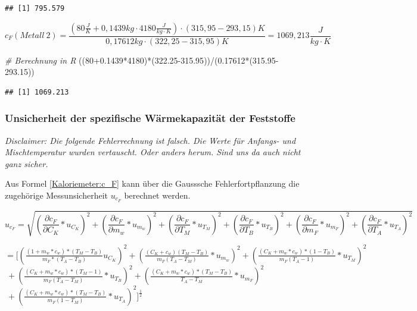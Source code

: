 \documentclass[
  9pt,
]{article}
\newenvironment{Shaded}{\begin{snugshade}}{\end{snugshade}}
\newcommand{\CommentTok}[1]{\textcolor[rgb]{0.56,0.35,0.01}{\textit{#1}}}
\newcommand{\DecValTok}[1]{\textcolor[rgb]{0.00,0.00,0.81}{#1}}
\newcommand{\FloatTok}[1]{\textcolor[rgb]{0.00,0.00,0.81}{#1}}
\newcommand{\NormalTok}[1]{#1}
\newcommand{\SpecialCharTok}[1]{\textcolor[rgb]{0.00,0.00,0.00}{#1}}
\begin{document}
\begin{verbatim}
## [1] 795.579
\end{verbatim}

\[c_F(Metall\ 2) = \frac{(80\frac{J}{K}+0,1439kg\cdot 4180\frac{J}{kg\cdot K})\cdot (315,95-293,15)K}{0,17612kg\cdot(322,25-315,95)K}= 1069,213\frac{J}{kg\cdot K}\]

\begin{Shaded}
\begin{Highlighting}[]
\CommentTok{\# Berechnung in R}
\NormalTok{((}\DecValTok{80}\FloatTok{+0.1439}\SpecialCharTok{*}\DecValTok{4180}\NormalTok{)}\SpecialCharTok{*}\NormalTok{(}\FloatTok{322.25{-}315.95}\NormalTok{))}\SpecialCharTok{/}\NormalTok{(}\FloatTok{0.17612}\SpecialCharTok{*}\NormalTok{(}\FloatTok{315.95{-}293.15}\NormalTok{))}
\end{Highlighting}
\end{Shaded}

\begin{verbatim}
## [1] 1069.213
\end{verbatim}

\hypertarget{unsicherheit-der-spezifische-wuxe4rmekapazituxe4t-der-feststoffe}{%
\subsubsection{Unsicherheit der spezifische Wärmekapazität der
Feststoffe}\label{unsicherheit-der-spezifische-wuxe4rmekapazituxe4t-der-feststoffe}}

\emph{Disclaimer: Die folgende Fehlerrechnung ist falsch. Die Werte für
Anfangs- und Mischtemperatur wurden vertauscht. Oder anders herum. Sind
uns da auch nicht ganz sicher.}

Aus Formel \ref{Kaloriemeter:c_F} kann über die Gausssche
Fehlerfortpflanzung die zugehörige Messunsicherheit \(u_{c_F}\)
berechnet werden.

\[u_{c_F}=\sqrt{(\frac{\partial c_F}{\partial C_K}*u_{C_K})^2+(\frac{\partial c_F}{\partial m_w}*u_{m_w})^2+(\frac{\partial c_F}{\partial T_M}*u_{T_M})^2+ (\frac{\partial c_F}{\partial T_B}*u_{T_B})^2+ (\frac{\partial c_F}{\partial m_F}*u_{m_F})^2+ (\frac{\partial c_F}{\partial T_A}*u_{T_A})^2}\]

\(=[(\frac{(1+m_w*c_w)*(T_M-T_B)}{m_F*(T_A-T_B)}u_{C_K})^2+(\frac{(C_K+c_w)(T_M-T_B)}{m_F(T_A-T_M)}*u_{m_w})^2+(\frac{(C_K+m_w*c_w)*(1-T_B)}{m_F(T_A-1)}*u_{T_M})^2\)
\(\ +(\frac{(C_K+m_w*c_w)*(T_M-1)}{m_F(T_A-T_M)}*u_{T_B})^2+(\frac{(C_K+m_w*c_w)*(T_M-T_B)}{T_A-T_M}*u_{m_F})^2\)
\(\ +(\frac{(C_K+m_w*c_w)*(T_M-T_B)}{m_F(1-T_M)}*u_{T_A})^2]^{\frac{1}{2}}\)
\end{document}

